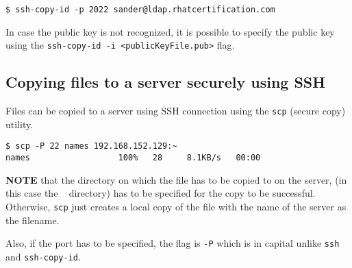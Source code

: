 \begin{verbatim}
$ ssh-copy-id -p 2022 sander@ldap.rhatcertification.com
\end{verbatim}

In case the public key is not recognized, it is possible to specify the public key using the \verb|ssh-copy-id -i <publicKeyFile.pub>| flag.

\subsection{Copying files to a server securely using SSH}
Files can be copied to a server using SSH connection using the \verb|scp| (secure copy) utility. 

\begin{verbatim}
$ scp -P 22 names 192.168.152.129:~
names                  100%   28     8.1KB/s   00:00    
\end{verbatim}

\noindent
\textbf{NOTE} that the directory on which the file has to be copied to on the server, (in this case the ~ directory) has to be specified for the copy to be successful. Otherwise, \verb|scp| just creates a local copy of the file with the name of the server as the filename. 

Also, if the port has to be specified, the flag is \verb|-P| which is in capital unlike \verb|ssh| and \verb|ssh-copy-id|.
